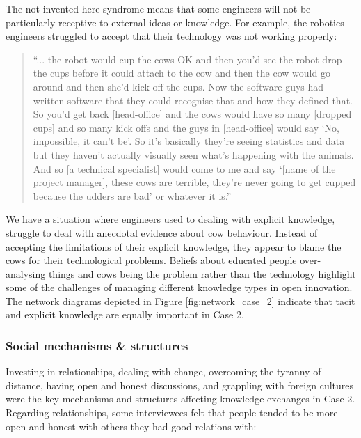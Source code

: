The not-invented-here syndrome means that some engineers will not be particularly receptive to external ideas or knowledge. For example, the robotics engineers struggled to accept that their technology was not working properly:  

\begin{quote}
\small
\enquote{... the robot would cup the cows OK and then you'd see the robot drop the cups before it could attach to the cow and then the cow would go around and then she'd kick off the cups. Now the software guys had written software that they could recognise that and how they defined that. So you'd get back [head-office] and the cows would have so many [dropped cups] and so many kick offs and the guys in [head-office] would say \enquote{No, impossible, it can't be}. So it's basically they're seeing statistics and data but they haven't actually visually seen what's happening with the animals. And so [a technical specialist] would come to me and say \enquote{[name of the project manager], these cows are terrible, they're never going to get cupped because the udders are bad} or whatever it is.} \\
\end{quote}

We have a situation where engineers used to dealing with explicit knowledge, struggle to deal with anecdotal evidence about cow behaviour. Instead of accepting the limitations of their explicit knowledge, they appear to blame the cows for their technological problems. Beliefs about educated people over-analysing things and cows being the problem rather than the technology highlight some of the challenges of managing different knowledge types in open innovation. The network diagrams depicted in Figure \ref{fig:network_case_2} indicate that tacit and explicit knowledge are equally important in Case 2. 
 
\subsubsection{Social mechanisms \& structures}

Investing in relationships, dealing with change, overcoming the tyranny of distance, having open and honest discussions, and grappling with foreign cultures were the key mechanisms and structures affecting knowledge exchanges in Case 2. Regarding relationships, some interviewees felt that people tended to be more open and honest with others they had good relations with:


